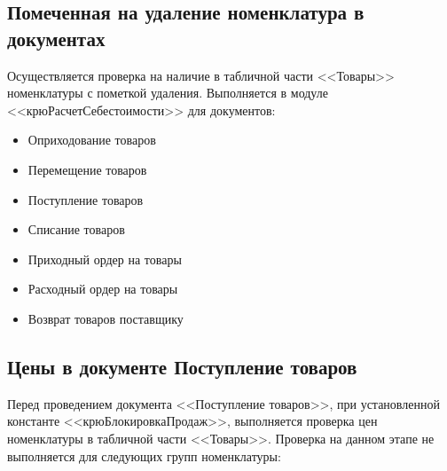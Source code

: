 \subsection{Помеченная на удаление номенклатура в документах}\label{1005}	 

Осуществляется проверка на наличие в табличной части <<Товары>> номенклатуры с пометкой удаления.
Выполняется в модуле <<крюРасчетСебестоимости>> для документов: 


\begin{itemize}
	\item Оприходование товаров
	\item Перемещение товаров
	\item Поступление товаров
	\item Списание товаров
	\item Приходный ордер на товары
	\item Расходный ордер на товары
	\item Возврат товаров поставщику
	
\end{itemize}

\subsection{Цены в документе Поступление товаров}\label{1006}	 

Перед проведением документа <<Поступление товаров>>, при установленной константе <<крюБлокировкаПродаж>>, выполняется проверка цен номенклатуры в табличной части <<Товары>>. Проверка на данном этапе не выполняется для следующих групп номенклатуры:

